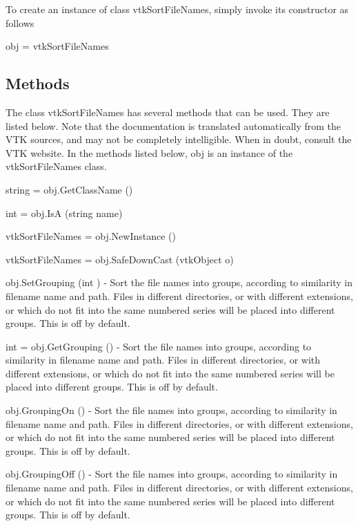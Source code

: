 To create an instance of class vtk\-Sort\-File\-Names, simply invoke its constructor as follows \begin{DoxyVerb}  obj = vtkSortFileNames
\end{DoxyVerb}
 \hypertarget{vtkwidgets_vtkxyplotwidget_Methods}{}\subsection{Methods}\label{vtkwidgets_vtkxyplotwidget_Methods}
The class vtk\-Sort\-File\-Names has several methods that can be used. They are listed below. Note that the documentation is translated automatically from the V\-T\-K sources, and may not be completely intelligible. When in doubt, consult the V\-T\-K website. In the methods listed below, {\ttfamily obj} is an instance of the vtk\-Sort\-File\-Names class. 
\begin{DoxyItemize}
\item {\ttfamily string = obj.\-Get\-Class\-Name ()}  
\item {\ttfamily int = obj.\-Is\-A (string name)}  
\item {\ttfamily vtk\-Sort\-File\-Names = obj.\-New\-Instance ()}  
\item {\ttfamily vtk\-Sort\-File\-Names = obj.\-Safe\-Down\-Cast (vtk\-Object o)}  
\item {\ttfamily obj.\-Set\-Grouping (int )} -\/ Sort the file names into groups, according to similarity in filename name and path. Files in different directories, or with different extensions, or which do not fit into the same numbered series will be placed into different groups. This is off by default.  
\item {\ttfamily int = obj.\-Get\-Grouping ()} -\/ Sort the file names into groups, according to similarity in filename name and path. Files in different directories, or with different extensions, or which do not fit into the same numbered series will be placed into different groups. This is off by default.  
\item {\ttfamily obj.\-Grouping\-On ()} -\/ Sort the file names into groups, according to similarity in filename name and path. Files in different directories, or with different extensions, or which do not fit into the same numbered series will be placed into different groups. This is off by default.  
\item {\ttfamily obj.\-Grouping\-Off ()} -\/ Sort the file names into groups, according to similarity in filename name and path. Files in different directories, or with different extensions, or which do not fit into the same numbered series will be placed into different groups. This is off by default.  

\end{DoxyItemize}

